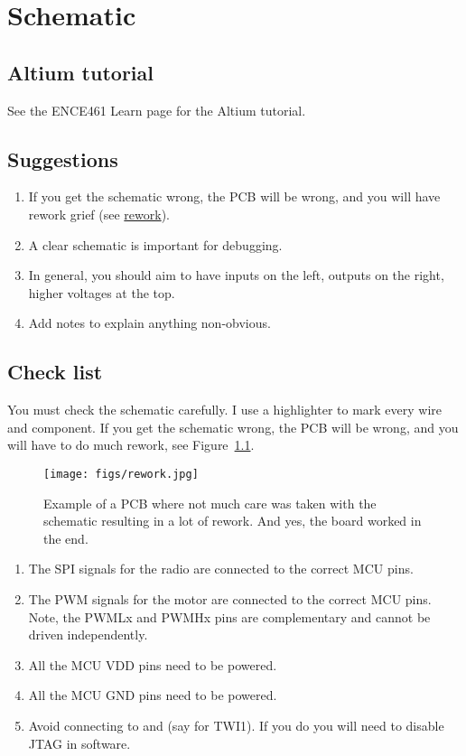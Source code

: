 \chapter{Schematic}


\section{Altium tutorial}


See the ENCE461 Learn page for the Altium tutorial.


\section{Suggestions}

\begin{enumerate}
\item If you get the schematic wrong, the PCB will be wrong, and you
  will have rework grief (see \hyperref[rework]{rework}).

\item A clear schematic is important for debugging.

\item In general, you should aim to have inputs on the left, outputs
  on the right, higher voltages at the top.

\item Add notes to explain anything non-obvious.
\end{enumerate}



\section{Check list}
\label{PCB-check-list}

You must check the schematic carefully.  I use a highlighter to mark
every wire and component.  If you get the schematic wrong, the PCB
will be wrong, and you will have to do much rework, see
Figure~\ref{fig:rework}.


\begin{figure}
  \centering
  \texttt{[image: figs/rework.jpg]}
  \caption{Example of a PCB where not much care was taken with the
    schematic resulting in a lot of rework.  And yes, the board worked
    in the end.}
  \label{fig:rework}
\end{figure}



\begin{enumerate}
\item
  The SPI signals for the radio are connected to the correct MCU pins.
\item
  The PWM signals for the motor are connected to the correct MCU pins.
  Note, the PWMLx and PWMHx pins are complementary and cannot be driven
  independently.
\item
  All the MCU VDD pins need to be powered.
\item
  All the MCU GND pins need to be powered.
\item
  Avoid connecting to  and  (say for TWI1).  If you
  do you will need to disable JTAG in software.
\end{enumerate}
